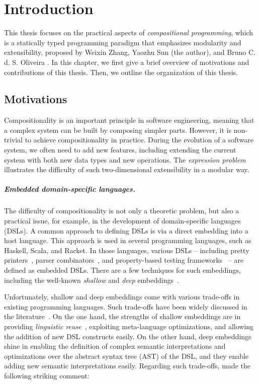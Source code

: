 \chapter{Introduction} \label{ch:introduction}

This thesis focuses on the practical aspects of \emph{compositional
programming}, which is a statically typed programming paradigm that emphasizes
modularity and extensibility, proposed by Weixin Zhang, Yaozhu Sun (the author),
and Bruno C. d. S. Oliveira \citeyearpar{zhang2021compositional}. In this
chapter, we first give a brief overview of motivations and contributions of this
thesis. Then, we outline the organization of this thesis.

\section{Motivations}

Compositionality is an important principle in software engineering, meaning
that a complex system can be built by composing simpler parts. However, it is
non-trivial to achieve compositionality in practice. During the evolution of a
software system, we often need to add new features, including extending the
current system with both new data types and new operations. The \emph{expression
problem}~\citep{wadler1998expression} illustrates the difficulty of such
two-dimensional extensibility in a modular way.

\paragraph{Embedded domain-specific languages.}
The difficulty of compositionality is not only a theoretic problem, but also a
practical issue, for example, in the development of domain-specific languages
(DSLs). A common approach to defining DSLs is via a direct embedding into a host
language. This approach is used in several programming languages, such as
Haskell, Scala, and Racket. In those languages, various DSLs -- including pretty
printers~\citep{hughes1995design,wadler2003prettier}, parser
combinators~\citep{leijen2001parsec}, and property-based testing
frameworks~\citep{claessen2000quickcheck} -- are defined as embedded DSLs. There
are a few techniques for such embeddings, including the well-known
\emph{shallow} and \emph{deep} embeddings~\citep{boulton1992experience}.

Unfortunately, shallow and deep embeddings come with various trade-offs in
existing programming languages. Such trade-offs have been widely discussed in
the literature~\citep{rompf2012scala,scherr2014implicit,gibbons2014folding}. On
the one hand, the strengths of shallow embeddings are in providing
\emph{linguistic reuse}~\citep{krishnamurthi2001linguistic}, exploiting
meta-language optimizations, and allowing the addition of new DSL constructs
easily. On the other hand, deep embeddings shine in enabling the definition of
complex semantic interpretations and optimizations over the abstract syntax tree
(AST) of the DSL, and they enable adding new semantic interpretations easily.
Regarding such trade-offs, \citet{svenningsson2015combining} made the following
striking comment:

